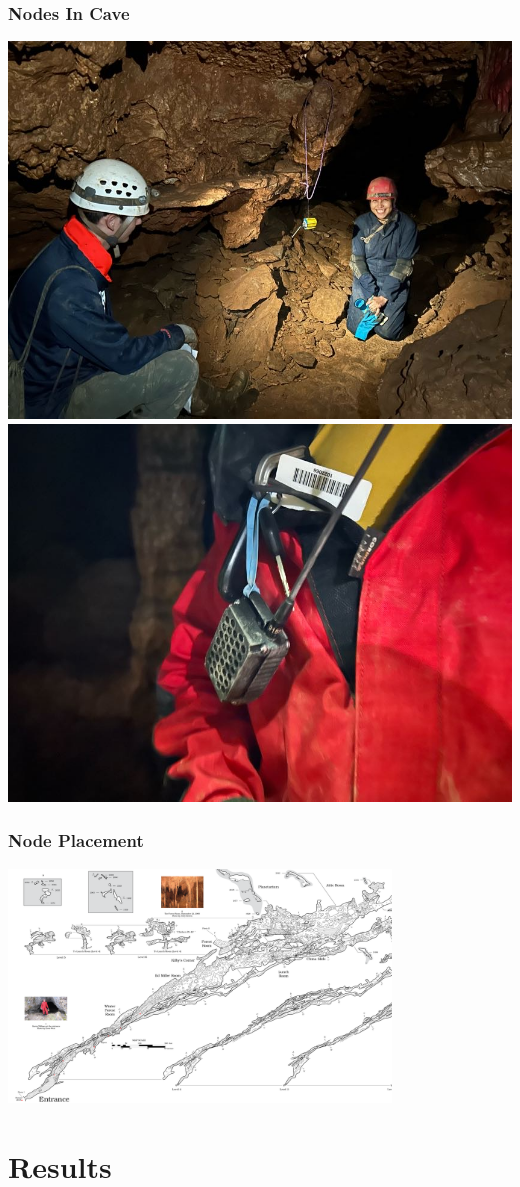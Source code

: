 \documentclass{beamer}
\begin{document}
\begin{frame}
\frametitle{Nodes In Cave}

\begin{center}
\includegraphics[width=.47\textwidth]{../images/IMG_5732.jpg}\hfill
\includegraphics[width=.47\textwidth]{../images/IMG_5751.jpg}
\end{center}

\end{frame}

\begin{frame}
\frametitle{Node Placement}

\begin{center}
\includegraphics[width=4.0in]{../images/New-River-June-4-2024.png}
\end{center}

\end{frame}

\section{Results}
\end{document}
